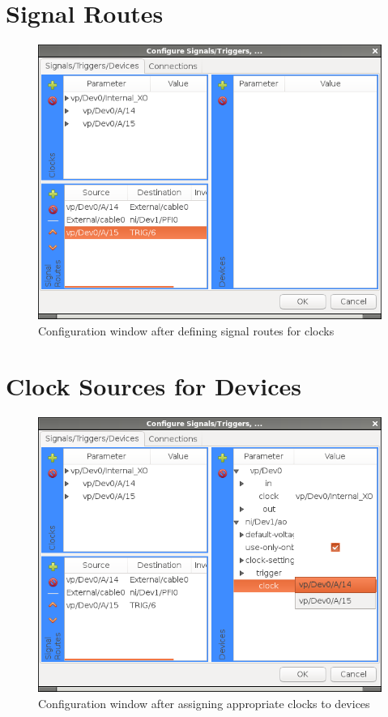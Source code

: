 \section{Signal Routes}

\begin{figure}[ht]
  \centerline{\includegraphics[width=.5\textwidth]{figures/routes-added}}
  \caption{Configuration window after defining signal routes for clocks}
  \label{fig:devcfg:routes-added}
\end{figure}


\section{Clock Sources for Devices}

\begin{figure}[ht]
  \centerline{\includegraphics[width=.5\textwidth]{figures/devices-set-clocks}}
  \caption{Configuration window after assigning appropriate clocks to
  devices}
  \label{fig:devcfg:devices-set-clocks}
\end{figure}
